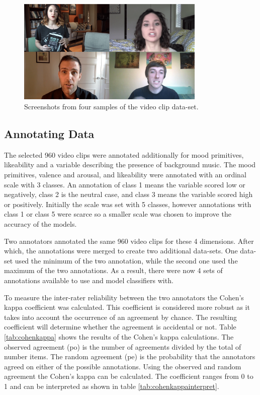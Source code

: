 \begin{figure}[h]
  \centering
  \includegraphics[width=0.8\textwidth]{Images/sample_video_clips-min.png}
  \caption{Screenshots from four samples of the video clip data-set.}
  \label{fig:ssvideoclip}
\end{figure}


\subsection{Annotating Data}
\label{subsection:annotatingdata}
The selected 960 video clips were annotated additionally for mood primitives, likeability and a variable describing the presence of background music. The mood primitives, valence and arousal, and likeability were annotated with an ordinal scale with 3 classes. An annotation of class 1 means the variable scored low or negatively, class 2 is the neutral case, and class 3 means the variable scored high or positively. Initially the scale was set with 5 classes, however annotations with class 1 or class 5 were scarce so a smaller scale was chosen to improve the accuracy of the models. 

Two annotators annotated the same 960 video clips for these 4 dimensions. After which, the annotations were merged to create two additional data-sets. One data-set used the minimum of the two annotation, while the second one used the maximum of the two annotations. As a result, there were now 4 sets of annotations available to use and model classifiers with.

To measure the inter-rater reliability between the two annotators the Cohen's kappa coefficient was calculated. This coefficient is considered more robust as it takes into account the occurrence of an agreement by chance. The resulting coefficient will determine whether the agreement is accidental or not. Table \ref{tab:cohenkappa} shows the results of the Cohen's kappa calculations. The observed agreement (po) is the number of agreements divided by the total of number items. The random agreement (pe) is the probability that the annotators agreed on either of the possible annotations. Using the observed and random agreement the Cohen's kappa can be calculated. The coefficient ranges from 0 to 1 and can be interpreted as shown in table \ref{tab:cohenkappainterpret}.

